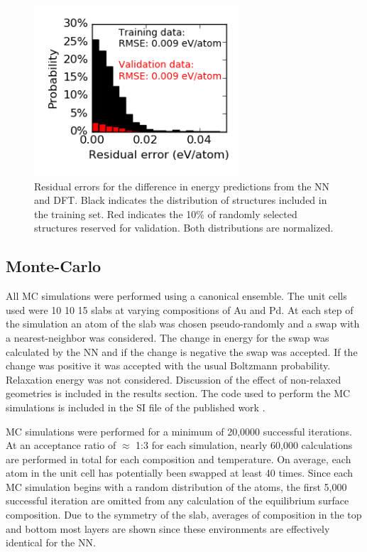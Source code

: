 \documentclass[12pt]{cmuthesis}
\begin{document}
\begin{figure}[h]
\centering
\includegraphics[width=3in]{./images/distribution.png}
\caption{\label{fig-distribution}
Residual errors for the  difference in energy predictions from the NN and DFT. Black indicates the distribution of structures included in the training set. Red indicates the 10\% of randomly selected structures reserved for validation. Both distributions are normalized.}
\end{figure}

\subsection{Monte-Carlo}
\label{sec:org35b0a65}
All MC simulations were performed using a canonical ensemble. The unit cells used were 10 \texttimes{} 10 \texttimes{} 15 slabs at varying compositions of Au and Pd. At each step of the simulation an atom of the slab was chosen pseudo-randomly and a swap with a nearest-neighbor was considered.  The change in energy for the swap was calculated by the NN and if the change is negative the swap was accepted. If the change was positive it was accepted with the usual Boltzmann probability. Relaxation energy was not considered. Discussion of the effect of non-relaxed geometries is included in the results section. The code used to perform the MC simulations is included in the SI file of the published work \cite{boes-2017-model-segreg}.

MC simulations were performed for a minimum of 20,0000 successful iterations. At an acceptance ratio of \(\approx\) 1:3 for each simulation, nearly 60,000 calculations are performed in total for each composition and temperature. On average, each atom in the unit cell has potentially been swapped at least 40 times. Since each MC simulation begins with a random distribution of the atoms, the first 5,000 successful iteration are omitted from any calculation of the equilibrium surface composition. Due to the symmetry of the slab, averages of composition in the top and bottom most layers are shown since these environments are effectively identical for the NN.
\end{document}
